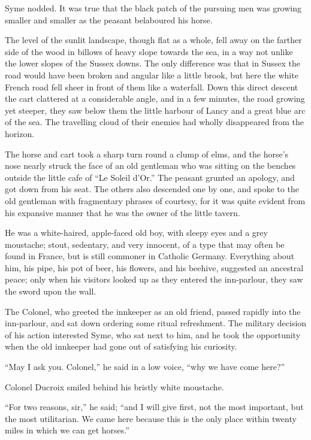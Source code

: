 \documentclass{book}
\begin{document}
Syme nodded. It was true that the black patch of the pursuing men was growing smaller and smaller as the peasant belaboured his horse.

The level of the sunlit landscape, though flat as a whole, fell away on the farther side of the wood in billows of heavy slope towards the sea, in a way not unlike the lower slopes of the Sussex downs. The only difference was that in Sussex the road would have been broken and angular like a little brook, but here the white French road fell sheer in front of them like a waterfall. Down this direct descent the cart clattered at a considerable angle, and in a few minutes, the road growing yet steeper, they saw below them the little harbour of Lancy and a great blue arc of the sea. The travelling cloud of their enemies had wholly disappeared from the horizon.

The horse and cart took a sharp turn round a clump of elms, and the horse’s nose nearly struck the face of an old gentleman who was sitting on the benches outside the little cafe of “Le Soleil d’Or.” The peasant grunted an apology, and got down from his seat. The others also descended one by one, and spoke to the old gentleman with fragmentary phrases of courtesy, for it was quite evident from his expansive manner that he was the owner of the little tavern.

He was a white-haired, apple-faced old boy, with sleepy eyes and a grey moustache; stout, sedentary, and very innocent, of a type that may often be found in France, but is still commoner in Catholic Germany. Everything about him, his pipe, his pot of beer, his flowers, and his beehive, suggested an ancestral peace; only when his visitors looked up as they entered the inn-parlour, they saw the sword upon the wall.

The Colonel, who greeted the innkeeper as an old friend, passed rapidly into the inn-parlour, and sat down ordering some ritual refreshment. The military decision of his action interested Syme, who sat next to him, and he took the opportunity when the old innkeeper had gone out of satisfying his curiosity.

“May I ask you. Colonel,” he said in a low voice, “why we have come here?”

Colonel Ducroix smiled behind his bristly white moustache.

“For two reasons, sir,” he said; “and I will give first, not the most important, but the most utilitarian. We came here because this is the only place within twenty miles in which we can get horses.”
\end{document}
